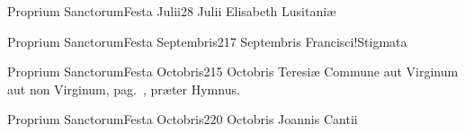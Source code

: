 \documentclass[psalterium-feriale.tex]{subfiles}
\begin{document}
	{Proprium Sanctorum}{Festa Julii}{2}{8 Julii}
	{}{}{Elisabeth Lusitaniæ}
	{}
	{}

\newpage
{}
	{Proprium Sanctorum}{Festa Septembris}{2}{17 Septembris}
	{}{}{Francisci!Stigmata}
	{}
	{}

	{Proprium Sanctorum}{Festa Octobris}{2}{15 Octobris}
	{}{}{Teresiæ}
	{Commune aut Virginum aut non Virginum, pag.\ \pageref{M-MU}, præter Hymnus.}
	{}

	{Proprium Sanctorum}{Festa Octobris}{2}{20 Octobris}
	{}{}{Joannis Cantii}
	{}
	{}
\end{document}
